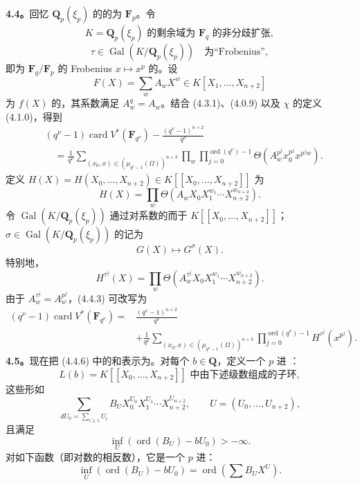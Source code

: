 \textbf{4.4。}回忆 $\mathbf Q_p(\xi_p)$ 的的为 $\mathbf F_p$。令
\[
K=\mathbf Q_p(\xi_p)\text{ 的剩余域为 }\mathbf F_q\text{ 的非分歧扩张},\tag{4.4.0}
\]
\[
\tau\in\operatorname{Gal}(K/\mathbf Q_p(\xi_p))\quad\text{为“Frobenius”},\tag{4.4.1}
\]
即为 $\mathbf F_q/\mathbf F_p$ 的 Frobenius  $x\mapsto x^p$ 的。设
\[
F(X)=\sum_w A_wX^w\in K[X_1,\ldots,X_{n+2}]\tag{4.4.2}
\]
为 $f(X)$ 的，其系数满足 $A_w^q=A_w$。结合 (4.3.1)、(4.0.9) 以及 $\chi$ 的定义 (4.1.0)，得到
\[
\begin{aligned}
{}&(q^\nu-1)\operatorname{card}V^*(\mathbf F_{q^\nu})-\frac{(q^\nu-1)^{n+2}}{q^\nu}\\
&\quad=\frac1{q^\nu}\sum_{(x_0,x)\in(\mu_{q^\nu-1}(\Omega))^{n+3}}
\prod_w\prod_{j=0}^{\operatorname{ord}(q^\nu)-1}
\Theta(A_w^{p^j}x_0^{p^j}x^{p^jw}).
\end{aligned}\tag{4.4.3}
\]
定义 $H(X)=H(X_0,\ldots,X_{n+2})\in K[[X_0,\ldots,X_{n+2}]]$ 为
\[
H(X)=\prod_w\Theta(A_wX_0X_1^{w_1}\cdots X_{n+2}^{w_{n+2}}).\tag{4.4.4}
\]
令 $\operatorname{Gal}(K/\mathbf Q_p(\xi_p))$ 通过对系数的而于 $K[[X_0,\ldots,X_{n+2}]]$；$\sigma\in\operatorname{Gal}(K/\mathbf Q_p(\xi_p))$ 的记为
\[
G(X)\longmapsto G^\sigma(X).\tag{4.4.5}
\]
特别地，
\[
H^{\tau^j}(X)=\prod_w\Theta(A_w^{\tau^j}X_0X_1^{w_1}\cdots X_{n+2}^{w_{n+2}}).
\]
由于 $A_w^{\tau^j}=A_w^{p^j}$，(4.4.3) 可改写为
\[
\begin{aligned}
(q^\nu-1)\operatorname{card}V^*(\mathbf F_{q^\nu})
={}&\frac{(q^\nu-1)^{n+2}}{q^\nu}\\
&+\frac1{q^\nu}\sum_{(x_0,x)\in(\mu_{q^\nu-1}(\Omega))^{n+3}}
\prod_{j=0}^{\operatorname{ord}(q^\nu)-1}H^{\tau^j}(x^{p^j}).
\end{aligned}\tag{4.4.6}
\]
\textbf{4.5。}现在把 (4.4.6) 中的和表示为。对每个 $b\in\mathbf Q$，定义一个 $p$ 进 ：
\[
L(b)=K[[X_0,\ldots,X_{n+2}]]\text{ 中由下述级数组成的子环},\tag{4.5.1}
\]
这些形如
\[
\sum_{dU_0=\sum_{i\ge1}U_i}B_UX_0^{U_0}X_1^{U_1}\cdots X_{n+2}^{U_{n+2}},
\qquad U=(U_0,\ldots,U_{n+2}),\tag{4.5.2}
\]
且满足
\[
\inf_U(\operatorname{ord}(B_U)-bU_0)>-\infty.\tag{4.5.3}
\]
对如下函数（即对数的相反数），它是一个 $p$ 进：
\[
\inf_U(\operatorname{ord}(B_U)-bU_0)=\operatorname{ord}\left(\sum B_UX^U\right).\tag{4.5.4}
\]
